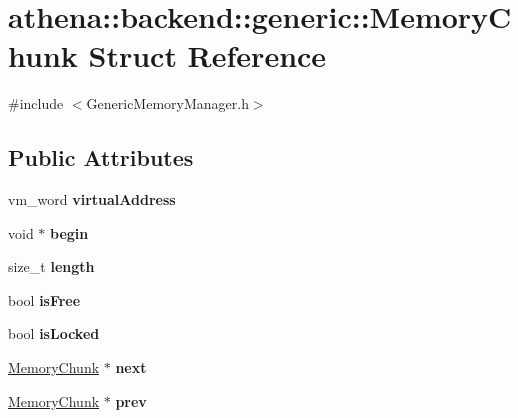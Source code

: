 \hypertarget{structathena_1_1backend_1_1generic_1_1_memory_chunk}{}\section{athena\+:\+:backend\+:\+:generic\+:\+:Memory\+Chunk Struct Reference}
\label{structathena_1_1backend_1_1generic_1_1_memory_chunk}


{\ttfamily \#include $<$Generic\+Memory\+Manager.\+h$>$}

\subsection*{Public Attributes}
\begin{DoxyCompactItemize}
\item 
\mbox{\label{structathena_1_1backend_1_1generic_1_1_memory_chunk_ad3c53eac117c1601d9305337e1a10fbf}} 
vm\+\_\+word {\bfseries virtual\+Address}
\item 
\mbox{\label{structathena_1_1backend_1_1generic_1_1_memory_chunk_aa9038ea35b158b4976da1991d9a219f8}} 
void $\ast$ {\bfseries begin}
\item 
\mbox{\label{structathena_1_1backend_1_1generic_1_1_memory_chunk_a0b3f7644bb120bc1da34458cc4f51ad3}} 
size\+\_\+t {\bfseries length}
\item 
\mbox{\label{structathena_1_1backend_1_1generic_1_1_memory_chunk_a8f2afc822c82e708315e86744182dc4b}} 
bool {\bfseries is\+Free}
\item 
\mbox{\label{structathena_1_1backend_1_1generic_1_1_memory_chunk_abc625d2255dd2424fd9472ebb902558d}} 
bool {\bfseries is\+Locked}
\item 
\mbox{\label{structathena_1_1backend_1_1generic_1_1_memory_chunk_aa7ef44cb17321d0f3e1ff19779dd6ade}} 
\mbox{\hyperlink{structathena_1_1backend_1_1generic_1_1_memory_chunk}{Memory\+Chunk}} $\ast$ {\bfseries next}
\item 
\mbox{\label{structathena_1_1backend_1_1generic_1_1_memory_chunk_ad61468f9a985ba872f81dc8526fc5c23}} 
\mbox{\hyperlink{structathena_1_1backend_1_1generic_1_1_memory_chunk}{Memory\+Chunk}} $\ast$ {\bfseries prev}
\end{DoxyCompactItemize}


